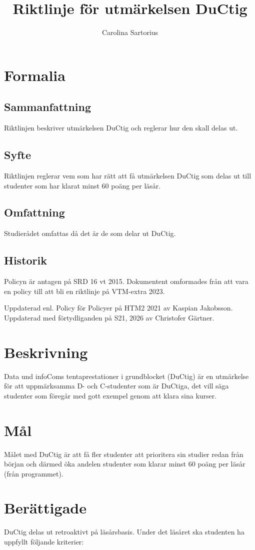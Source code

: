 \documentclass{dsekprotokoll}
\title{Riktlinje för utmärkelsen DuCtig}
\author{Carolina Sartorius}
\begin{document}
\maketitle

\section{Formalia}
\subsection{Sammanfattning}
Riktlinjen beskriver utmärkelsen DuCtig och reglerar hur den skall delas ut.
\subsection{Syfte}
Riktlinjen reglerar vem som har rätt att få utmärkelsen DuCtig som
delas ut till studenter som har klarat minst 60 poäng per läsår.
\subsection{Omfattning}
Studierådet omfattas då det är de som delar ut DuCtig.
\subsection{Historik}
Policyn är antagen på SRD 16 vt 2015. Dokumentent omformades från att
vara en policy till att bli en riktlinje på VTM-extra 2023.

Uppdaterad enl. Policy för Policyer på HTM2 2021 av Kaspian Jakobsson.
Uppdaterad med förtydliganden på S21, 2026 av Christofer Gärtner.

\section{Beskrivning}
Data und infoComs tentaprestationer i grundblocket (DuCtig) är en
utmärkelse för att uppmärksamma D- och C-studenter som är DuCtiga, det vill
säga studenter som föregår med gott exempel genom att klara sina kurser.

\section{Mål}
Målet med DuCtig är att få fler studenter att prioritera sin studier
redan från början och därmed
öka andelen studenter som klarar minst 60 poäng per läsår (från programmet).

\section{Berättigade}
DuCtig delas ut retroaktivt på läsårsbasis. Under det läsåret ska
studenten ha uppfyllt följande
kriterier:
\end{document}
